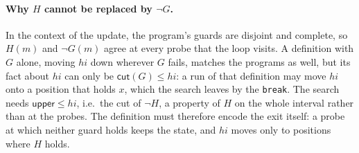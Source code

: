 \paragraph{Why $H$ cannot be replaced by $\neg G$.} In the context of the update, the program's guards are disjoint
and complete, so $H(m)$ and $\neg G(m)$ agree at every probe that the loop visits. A definition with $G$ alone,
moving $hi$ down wherever $G$ fails, matches the programs as well, but its fact about $hi$ can only be
$\mathsf{cut}(G) \le hi$: a run of that definition may move $hi$ onto a position that holds $x$, which the search
leaves by the \texttt{break}. The search needs $\mathsf{upper} \le hi$, i.e.\ the cut of $\neg H$, a property of $H$
on the whole interval rather than at the probes. The definition must therefore encode the exit itself: a probe at
which neither guard holds keeps the state, and $hi$ moves only to positions where $H$ holds.
